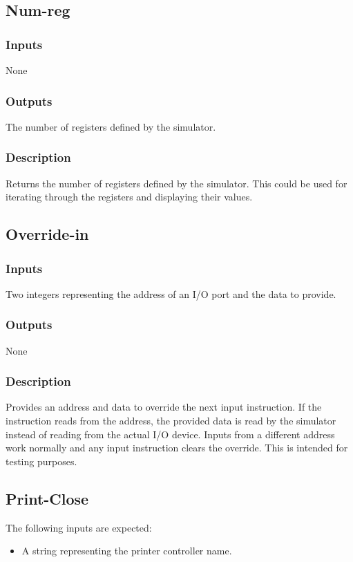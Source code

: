 \documentclass[10pt, openany]{book}
\begin{document}
\subsection{Num-reg}
\subsubsection{Inputs}
None
\subsubsection{Outputs}
The number of registers defined by the simulator.
\subsubsection{Description}
Returns the number of registers defined by the simulator.  This could be used for iterating through the registers and displaying their values.

\subsection{Override-in}
\subsubsection{Inputs}
Two integers representing the address of an I/O port and the data to provide.
\subsubsection{Outputs}
None
\subsubsection{Description}
Provides an address and data to override the next input instruction.  If the instruction reads from the address, the provided data is read by the simulator instead of reading from the actual I/O device.  Inputs from a different address work normally and any input instruction clears the override.  This is intended for testing purposes.

\subsection{Print-Close}
The following inputs are expected:
\begin{itemize}
  \item A string representing the printer controller name.
\end{itemize}
\end{document}
